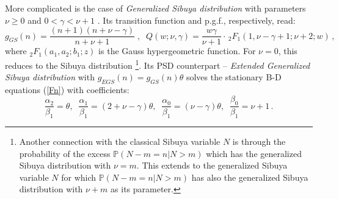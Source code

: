\documentclass[a4paper,12pt]{amsart}
\theoremstyle{definition}
\theoremstyle{remark}
\begin{document}
More complicated is the case of {\it Generalized Sibuya distribution} with parameters $\nu\geq 0$ and $0< \gamma<\nu +1$ \cite{Kozu2017}. Its transition function and p.g.f., respectively, read:
\begin{equation} \label{gsbd1}
  g_{GS}(n)= \frac{(n+1)(n+\nu-\gamma)}{n+\nu +1} \;,\;\; 
  Q(w;\nu,\gamma)  =\frac{w \gamma}{\nu + 1}\cdot\,
_2F_1(1, \nu-\gamma + 1;  \nu+ 2; w)\,,  
\end{equation} 
where $_2F_1(a_1,a_2;b_1;z)$ is the Gauss hypergeometric function. For $\nu=0$, this reduces to the Sibuya distribution \footnote{Another connection with the classical Sibuya variable $N$ is through the probability of the excess $\mathbb P(N-m=n|N>m)$ which has the generalized Sibuya distribution with $\nu=m$. This extends to the generalized Sibuya variable $N$ for which $\mathbb P(N-m=n|N>m)$ has also the generalized Sibuya distribution with $\nu+m$ as its parameter.}. Its PSD counterpart -- {\it Extended Generalized Sibuya distribution} with $g_{EGS}(n)=g_{GS}(n)\theta$ solves the stationary B-D equations (\ref{Fn}) with coefficients: 
\begin{equation}
\label{eq:abgensbd}
    \frac{\alpha_2}{\beta_1}=\theta,\;\; \frac{\alpha_1}{\beta_1}=(2+\nu-\gamma)\theta,\;\; \frac{\alpha_0}{\beta_1}=(\nu-\gamma)\theta,\;\; \frac{\beta_0}{\beta_1}=\nu+1\,.
\end{equation}
\end{document}
